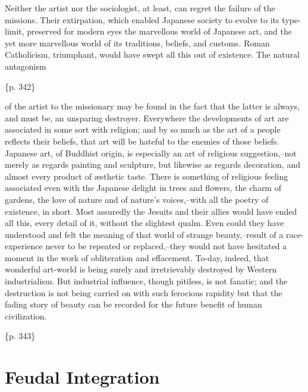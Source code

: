 Neither the artist nor the sociologist, at least, can regret the failure of the missions. Their extirpation, which enabled Japanese society to evolve to its type-limit, preserved for modern eyes the marvellous world of Japanese art, and the yet more marvellous world of its traditions, beliefs, and customs. Roman Catholicism, triumphant, would have swept all this out of existence. The natural antagonism

\{p. 342\}

of the artist to the missionary may be found in the fact that the latter is always, and must be, an unsparing destroyer. Everywhere the developments of art are associated in some sort with religion; and by so much as the art of a people reflects their beliefs, that art will be hateful to the enemies of those beliefs. Japanese art, of Buddhist origin, is especially an art of religious suggestion,--not merely as regards painting and sculpture, but likewise as regards decoration, and almost every product of æsthetic taste. There is something of religious feeling associated even with the Japanese delight in trees and flowers, the charm of gardens, the love of nature and of nature's voices,--with all the poetry of existence, in short. Most assuredly the Jesuits and their allies would have ended all this, every detail of it, without the slightest qualm. Even could they have understood and felt the meaning of that world of strange beauty,--result of a race-experience never to be repeated or replaced,--they would not have hesitated a moment in the work of obliteration and effacement. To-day, indeed, that wonderful art-world is being surely and irretrievably destroyed by Western industrialism. But industrial influence, though pitiless, is not fanatic; and the destruction is not being carried on with such ferocious rapidity but that the fading story of beauty can be recorded for the future benefit of human civilization.

\{p. 343\}

\section{Feudal Integration}
\label{sec:org918cf6b}


